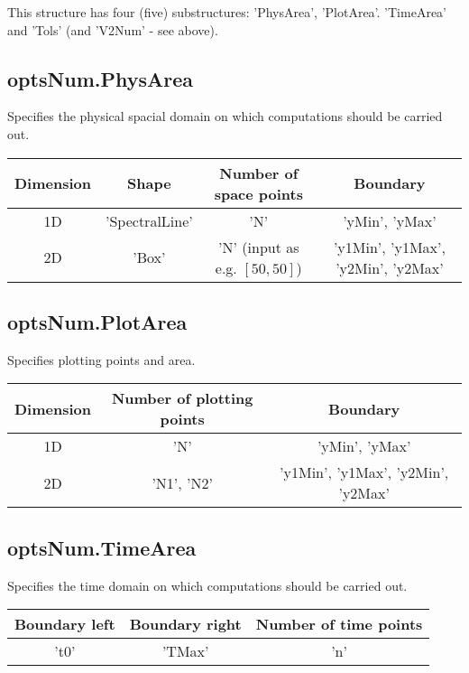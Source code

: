 \documentclass[11pt, a4paper]{article}
\theoremstyle{definition}
\begin{document}
This structure has four (five) substructures: 'PhysArea', 'PlotArea'. 'TimeArea' and 'Tols'	(and 'V2Num' - see above).

\subsection{optsNum.PhysArea}
Specifies the physical spacial domain on which computations should be carried out.
\begin{center}
	\begin{tabular}{ |c| c | c| c|}
		\hline
		Dimension &  Shape & Number of space points & Boundary \\ 
		\hline
		 1D & 'SpectralLine' & 'N' & 'yMin', 'yMax'\\
		 2D & 'Box' & 'N' (input as e.g. $[50,50]$) & 'y1Min', 'y1Max', 'y2Min', 'y2Max' \\ 
		\hline 
	\end{tabular}
\end{center}
\subsection{optsNum.PlotArea}
Specifies plotting points and area. 
\begin{center}
	\begin{tabular}{ |c| c | c| }
		\hline
		Dimension & Number of plotting points & Boundary \\ 
		\hline
		1D   & 'N' & 'yMin', 'yMax'\\
		2D & 'N1', 'N2'  & 'y1Min', 'y1Max', 'y2Min', 'y2Max' \\ 
		\hline 
	\end{tabular}
\end{center}	
\subsection{optsNum.TimeArea}
Specifies the time domain on which computations should be carried out.
\begin{center}
	\begin{tabular}{ | c | c | c |}
		\hline
		 Boundary left & Boundary right & Number of time points  \\ 
		\hline
	    't0' & 'TMax' & 'n'\\
		\hline 
	\end{tabular}
\end{center}	
	
\end{document}
